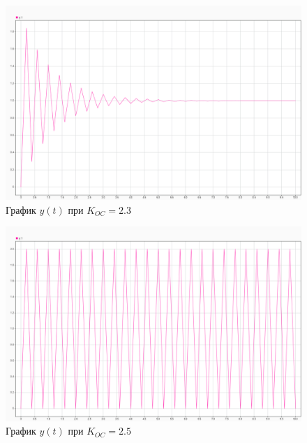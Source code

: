 \begin{figure}[H]
    \centering
\includegraphics[width=1.\linewidth,center]{assets/images/example1/3.png}
    \caption{График $y(t)$ при $K_{OC} = 2.3$}
    \label{fig:p3}
\end{figure}


\begin{figure}[H]
    \centering
\includegraphics[width=1.\linewidth,center]{assets/images/example1/4.png}
    \caption{График $y(t)$ при $K_{OC} = 2.5$}
    \label{fig:p4}
\end{figure}

